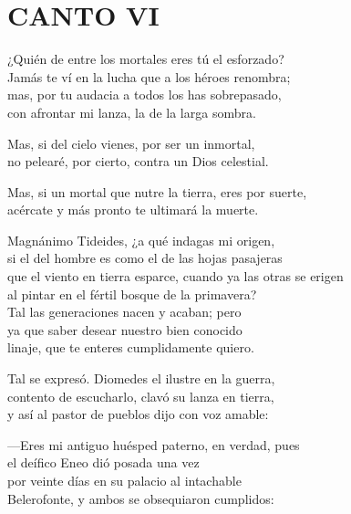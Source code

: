 \bnum
\section*{\centering\textbf{CANTO VI}}
%
\separator
\postart
{}
¿Quién de entre los mortales eres tú el esforzado?\\
Jamás te ví en la lucha que a los héroes renombra;\\
mas, por tu audacia a todos los has sobrepasado,\\
con afrontar mi lanza, la de la larga sombra.\par
\poend
\separator
%
\postart
{}
Mas, si del cielo vienes, por ser un inmortal,\\
no pelearé, por cierto, contra un Dios celestial.\par
\poend
\separator
%
\postart
{}
Mas, si un mortal que nutre la tierra, eres por suerte,\\
acércate y más pronto te ultimará la muerte.\par
\poend
\separator
%
\postart
{}
Magnánimo Tideides, ¿a qué indagas mi origen,\\
si el del hombre es como el de las hojas pasajeras\\
que el viento en tierra esparce, cuando ya las otras se erigen\\
al pintar en el fértil bosque de la primavera?\\
Tal las generaciones nacen y acaban; pero\\
ya que saber desear nuestro bien conocido\\
linaje, que te enteres cumplidamente quiero.\par
\poend
\separator
%
\postart
{}
Tal se expresó. Diomedes el ilustre en la guerra,\\
contento de escucharlo, clavó su lanza en tierra,\\
y así al pastor de pueblos dijo con voz amable:\par
---Eres mi antiguo huésped paterno, en verdad, pues\\
el deífico Eneo dió posada una vez\\
por veinte días en su palacio al intachable\\
Belerofonte, y ambos se obsequiaron cumplidos:\\
